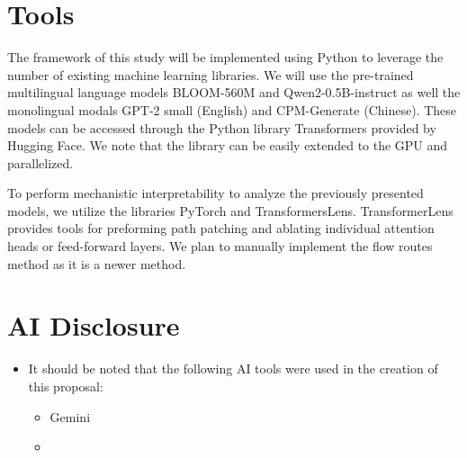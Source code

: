 \documentclass[11pt,a4paper]{article}
\newcommand{\blue}{\color{black}{}}
\newcommand{\black}{\color{black}{}}
\newcommand{\mb}{\color{black}{}}
\begin{document}
\black


\section{Tools}


\mb
The framework of this study will be implemented using Python to leverage the number of existing machine learning libraries. We will use the pre-trained multilingual language models BLOOM-560M and Qwen2-0.5B-instruct as well the monolingual modals GPT-2 small (English) and CPM-Generate (Chinese). These models can be accessed through the Python library Transformers provided by Hugging Face. We note that the library can be easily extended to the GPU and parallelized.

To perform mechanistic interpretability to analyze the previously presented models, we utilize the libraries PyTorch and TransformersLens. TransformerLens provides tools for preforming path patching and ablating individual attention heads or feed-forward layers. We plan to manually implement the flow routes method as it is a newer method. 


\black
\section{AI Disclosure}

\begin{itemize}
    \item It should be noted that the following AI tools were used in the creation of this proposal:
    \mb
    \begin{itemize}
        \item Gemini
        \item \blue{ChatGPT}
    \end{itemize}
\end{itemize}

\end{document}
